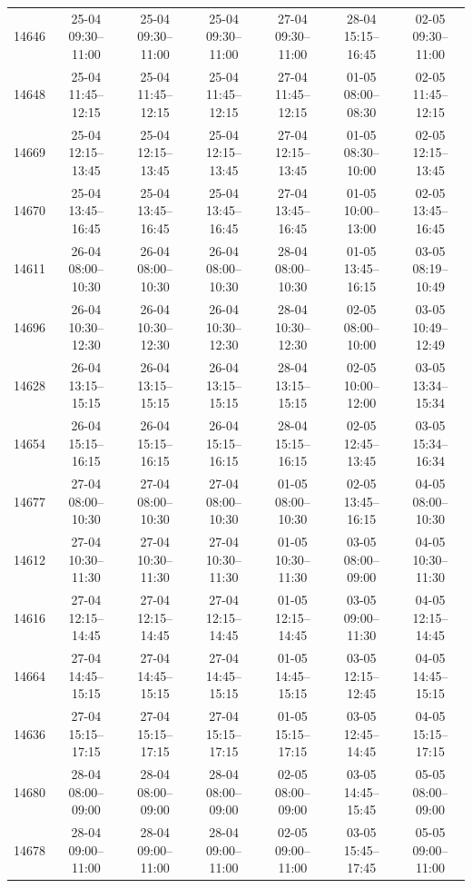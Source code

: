 \begin{table}[htbp]
\begin{tabular}{|r|c|c|c|c|c|c|}
14646 & 25-04 09:30--11:00 & 25-04 09:30--11:00 & 25-04 09:30--11:00 & 27-04 09:30--11:00 & 28-04 15:15--16:45 & 02-05 09:30--11:00 \\ 
14648 & 25-04 11:45--12:15 & 25-04 11:45--12:15 & 25-04 11:45--12:15 & 27-04 11:45--12:15 & 01-05 08:00--08:30 & 02-05 11:45--12:15 \\ 
14669 & 25-04 12:15--13:45 & 25-04 12:15--13:45 & 25-04 12:15--13:45 & 27-04 12:15--13:45 & 01-05 08:30--10:00 & 02-05 12:15--13:45 \\ 
14670 & 25-04 13:45--16:45 & 25-04 13:45--16:45 & 25-04 13:45--16:45 & 27-04 13:45--16:45 & 01-05 10:00--13:00 & 02-05 13:45--16:45 \\ 
14611 & 26-04 08:00--10:30 & 26-04 08:00--10:30 & 26-04 08:00--10:30 & 28-04 08:00--10:30 & 01-05 13:45--16:15 & 03-05 08:19--10:49 \\ 
14696 & 26-04 10:30--12:30 & 26-04 10:30--12:30 & 26-04 10:30--12:30 & 28-04 10:30--12:30 & 02-05 08:00--10:00 & 03-05 10:49--12:49 \\ 
14628 & 26-04 13:15--15:15 & 26-04 13:15--15:15 & 26-04 13:15--15:15 & 28-04 13:15--15:15 & 02-05 10:00--12:00 & 03-05 13:34--15:34 \\ 
14654 & 26-04 15:15--16:15 & 26-04 15:15--16:15 & 26-04 15:15--16:15 & 28-04 15:15--16:15 & 02-05 12:45--13:45 & 03-05 15:34--16:34 \\ 
14677 & 27-04 08:00--10:30 & 27-04 08:00--10:30 & 27-04 08:00--10:30 & 01-05 08:00--10:30 & 02-05 13:45--16:15 & 04-05 08:00--10:30 \\ 
14612 & 27-04 10:30--11:30 & 27-04 10:30--11:30 & 27-04 10:30--11:30 & 01-05 10:30--11:30 & 03-05 08:00--09:00 & 04-05 10:30--11:30 \\ 
14616 & 27-04 12:15--14:45 & 27-04 12:15--14:45 & 27-04 12:15--14:45 & 01-05 12:15--14:45 & 03-05 09:00--11:30 & 04-05 12:15--14:45 \\ 
14664 & 27-04 14:45--15:15 & 27-04 14:45--15:15 & 27-04 14:45--15:15 & 01-05 14:45--15:15 & 03-05 12:15--12:45 & 04-05 14:45--15:15 \\ 
14636 & 27-04 15:15--17:15 & 27-04 15:15--17:15 & 27-04 15:15--17:15 & 01-05 15:15--17:15 & 03-05 12:45--14:45 & 04-05 15:15--17:15 \\ 
14680 & 28-04 08:00--09:00 & 28-04 08:00--09:00 & 28-04 08:00--09:00 & 02-05 08:00--09:00 & 03-05 14:45--15:45 & 05-05 08:00--09:00 \\ 
14678 & 28-04 09:00--11:00 & 28-04 09:00--11:00 & 28-04 09:00--11:00 & 02-05 09:00--11:00 & 03-05 15:45--17:45 & 05-05 09:00--11:00 \\ 

\end{tabular}
\end{table}
